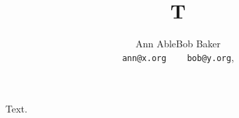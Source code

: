 \documentclass{article}
\begin{document}
\title{T}
\author{Ann Able\quad Bob Baker\\ \texttt{ann@x.org} ~\quad~~ \texttt{bob@y.org},}
\maketitle
Text.
\end{document}
